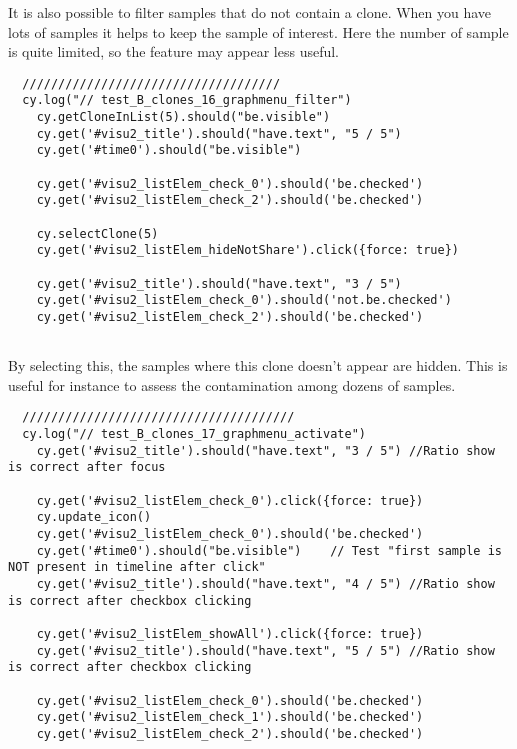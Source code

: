 
It is also possible to filter samples that do not contain a clone.  When you
have lots of samples it helps to keep the sample of interest.  Here the number
of sample is quite limited, so the feature may appear less useful.

\begin{verbatim}
  ////////////////////////////////////
  cy.log("// test_B_clones_16_graphmenu_filter")
    cy.getCloneInList(5).should("be.visible")
    cy.get('#visu2_title').should("have.text", "5 / 5")
    cy.get('#time0').should("be.visible")

    cy.get('#visu2_listElem_check_0').should('be.checked')
    cy.get('#visu2_listElem_check_2').should('be.checked')

    cy.selectClone(5)
    cy.get('#visu2_listElem_hideNotShare').click({force: true})

    cy.get('#visu2_title').should("have.text", "3 / 5")
    cy.get('#visu2_listElem_check_0').should('not.be.checked')
    cy.get('#visu2_listElem_check_2').should('be.checked')


\end{verbatim}

By selecting this, the samples where this clone doesn't appear are hidden.
This is useful for instance to assess the contamination among dozens of
samples.

\begin{verbatim}
  //////////////////////////////////////
  cy.log("// test_B_clones_17_graphmenu_activate")
    cy.get('#visu2_title').should("have.text", "3 / 5") //Ratio show is correct after focus

    cy.get('#visu2_listElem_check_0').click({force: true})
    cy.update_icon()
    cy.get('#visu2_listElem_check_0').should('be.checked')
    cy.get('#time0').should("be.visible")    // Test "first sample is NOT present in timeline after click"
    cy.get('#visu2_title').should("have.text", "4 / 5") //Ratio show is correct after checkbox clicking

    cy.get('#visu2_listElem_showAll').click({force: true})
    cy.get('#visu2_title').should("have.text", "5 / 5") //Ratio show is correct after checkbox clicking

    cy.get('#visu2_listElem_check_0').should('be.checked')
    cy.get('#visu2_listElem_check_1').should('be.checked')
    cy.get('#visu2_listElem_check_2').should('be.checked')


\end{verbatim}

